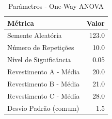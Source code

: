 \begin{table}[H]
\centering
\caption{Parâmetros - One-Way ANOVA}
\label{tab:parametros_oneway}
\begin{tabular}{|l|r|}
\hline
\textbf{Métrica} & \textbf{Valor} \\
\hline
Semente Aleatória & 123.0 \\
Número de Repetições & 10.0 \\
Nível de Significância & 0.05 \\
Revestimento A - Média & 20.0 \\
Revestimento B - Média & 21.0 \\
Revestimento C - Média & 28.0 \\
Desvio Padrão (comum) & 1.5 \\
\hline
\end{tabular}
\end{table}
